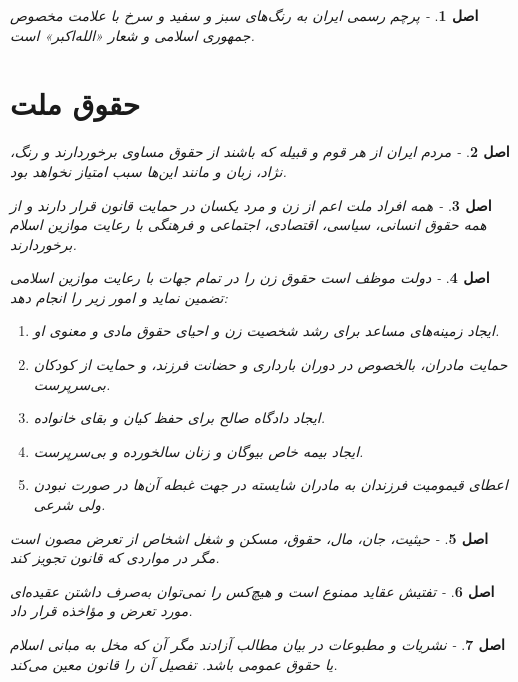\documentclass[12pt]{article}
\newtheorem{asl}{اصل}
\begin{document}
\begin{asl}- 
پرچم رسمی ایران به رنگ‌های سبز و سفید و سرخ با علامت مخصوص جمهوری اسلامی و شعار «الله‌اکبر» است‌.
\end{asl}

\section{حقوق ملت}
\begin{asl}- 
مردم ایران از هر قوم و قبیله که باشند از حقوق مساوی ‌برخوردارند و رنگ‌، نژاد، زبان و مانند این‌ها سبب امتیاز نخواهد بود.
\end{asl}

\begin{asl}- 
همه افراد ملت اعم از زن و مرد یکسان در حمایت قانون قرار دارند و از همه حقوق انسانی‌، سیاسی‌، اقتصادی‌، اجتماعی و فرهنگی با رعایت موازین اسلام برخوردارند.
\end{asl}

\begin{asl}- 
دولت موظف است حقوق زن را در تمام جهات با رعایت موازین اسلامی تضمین نماید و امور زیر را انجام دهد:
\begin{enumerate}
	\item 
	ایجاد زمینه‌های مساعد برای رشد شخصیت زن و احیای حقوق مادی و معنوی او.
	\item
	حمایت مادران‌، بالخصوص در دوران بارداری و حضانت فرزند، و حمایت از کودکان بی‌سرپرست‌.
	\item
	ایجاد دادگاه صالح برای حفظ کیان و بقای خانواده‌.
	\item
	ایجاد بیمه خاص بیوگان و زنان سالخورده و بی‌سرپرست‌.
	\item
	اعطای قیمومیت فرزندان به مادران شایسته در جهت غبطه آن‌ها در صورت نبودن ولی شرعی‌.
\end{enumerate}
\end{asl}

\begin{asl}- 
حیثیت‌، جان‌، مال‌، حقوق، مسکن و شغل اشخاص از تعرض مصون است مگر در مواردی که قانون تجویز کند.
\end{asl}

\begin{asl}- 
تفتیش عقاید ممنوع است و هیچ‌کس را نمی‌توان به‌صرف داشتن عقیده‌ای مورد تعرض و مؤاخذه قرار داد.
\end{asl}

\begin{asl}- 
نشریات و مطبوعات در بیان مطالب آزادند مگر آن که مخل به مبانی اسلام یا حقوق عمومی باشد. تفصیل آن را قانون معین می‌کند.
\end{asl}
\end{document}
